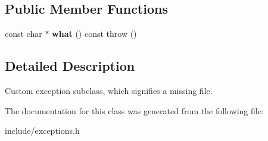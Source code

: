 \subsection*{Public Member Functions}
\begin{DoxyCompactItemize}
\item 
\mbox{\label{classFileNotFoundError_a643cf972753a4adba51d5850cbc619f4}} 
const char $\ast$ {\bfseries what} () const  throw ()
\end{DoxyCompactItemize}


\subsection{Detailed Description}
Custom exception subclass, which signifies a missing file. 

The documentation for this class was generated from the following file\+:\begin{DoxyCompactItemize}
\item 
include/exceptions.\+h\end{DoxyCompactItemize}
